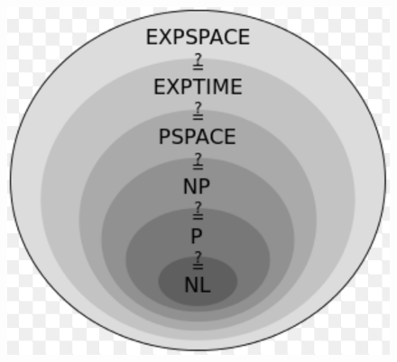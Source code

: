 \documentclass{article}
\begin{document}
\begin{figure}[h]
    \includegraphics[scale=0.5]{PSPACE.png}
\end{figure}
\end{document}

